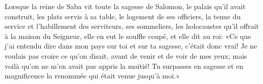 Lorsque la reine de Saba vit toute la sagesse de Salomon, le palais qu’il avait construit,
	les plats servis à sa table, le logement de ses officiers,
	la tenue du service et l’habillement des serviteurs,
	ses sommeliers, les holocaustes qu’il offrait à la maison du Seigneur,
	elle en eut le souffle coupé, et elle dit au roi:
	«Ce que j’ai entendu dire dans mon pays sur toi et sur ta sagesse,
	c’était donc vrai!
Je ne voulais pas croire ce qu’on disait, avant de venir et de voir de mes yeux;
	mais voilà qu’on ne m’en avait pas appris la moitié!
Tu surpasses en sagesse et en magnificence la renommée qui était venue jusqu’à moi.»

